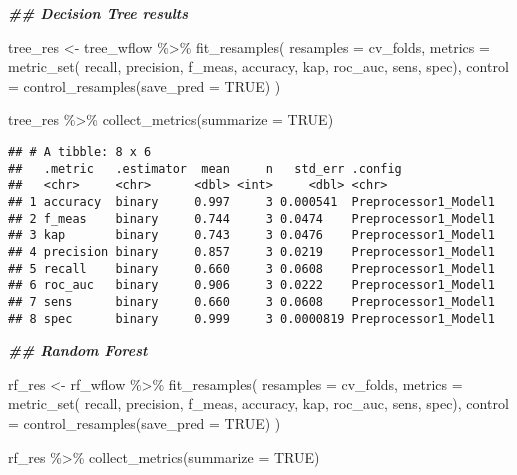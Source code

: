 \documentclass[
]{article}
\newenvironment{Shaded}{\begin{snugshade}}{\end{snugshade}}
\newcommand{\AttributeTok}[1]{\textcolor[rgb]{0.77,0.63,0.00}{#1}}
\newcommand{\ConstantTok}[1]{\textcolor[rgb]{0.00,0.00,0.00}{#1}}
\newcommand{\DocumentationTok}[1]{\textcolor[rgb]{0.56,0.35,0.01}{\textbf{\textit{#1}}}}
\newcommand{\FunctionTok}[1]{\textcolor[rgb]{0.00,0.00,0.00}{#1}}
\newcommand{\NormalTok}[1]{#1}
\newcommand{\OtherTok}[1]{\textcolor[rgb]{0.56,0.35,0.01}{#1}}
\newcommand{\SpecialCharTok}[1]{\textcolor[rgb]{0.00,0.00,0.00}{#1}}
\begin{document}
\begin{Shaded}
\begin{Highlighting}[]
\DocumentationTok{\#\# Decision Tree results}

\NormalTok{tree\_res }\OtherTok{\textless{}{-}}
\NormalTok{  tree\_wflow }\SpecialCharTok{\%\textgreater{}\%} 
  \FunctionTok{fit\_resamples}\NormalTok{(}
    \AttributeTok{resamples =}\NormalTok{ cv\_folds, }
    \AttributeTok{metrics =} \FunctionTok{metric\_set}\NormalTok{(}
\NormalTok{      recall, precision, f\_meas, }
\NormalTok{      accuracy, kap,}
\NormalTok{      roc\_auc, sens, spec),}
    \AttributeTok{control =} \FunctionTok{control\_resamples}\NormalTok{(}\AttributeTok{save\_pred =} \ConstantTok{TRUE}\NormalTok{)}
\NormalTok{    ) }

\NormalTok{tree\_res }\SpecialCharTok{\%\textgreater{}\%}  \FunctionTok{collect\_metrics}\NormalTok{(}\AttributeTok{summarize =} \ConstantTok{TRUE}\NormalTok{)}
\end{Highlighting}
\end{Shaded}

\begin{verbatim}
## # A tibble: 8 x 6
##   .metric   .estimator  mean     n   std_err .config             
##   <chr>     <chr>      <dbl> <int>     <dbl> <chr>               
## 1 accuracy  binary     0.997     3 0.000541  Preprocessor1_Model1
## 2 f_meas    binary     0.744     3 0.0474    Preprocessor1_Model1
## 3 kap       binary     0.743     3 0.0476    Preprocessor1_Model1
## 4 precision binary     0.857     3 0.0219    Preprocessor1_Model1
## 5 recall    binary     0.660     3 0.0608    Preprocessor1_Model1
## 6 roc_auc   binary     0.906     3 0.0222    Preprocessor1_Model1
## 7 sens      binary     0.660     3 0.0608    Preprocessor1_Model1
## 8 spec      binary     0.999     3 0.0000819 Preprocessor1_Model1
\end{verbatim}

\begin{Shaded}
\begin{Highlighting}[]
\DocumentationTok{\#\# Random Forest}

\NormalTok{rf\_res }\OtherTok{\textless{}{-}}
\NormalTok{  rf\_wflow }\SpecialCharTok{\%\textgreater{}\%} 
  \FunctionTok{fit\_resamples}\NormalTok{(}
    \AttributeTok{resamples =}\NormalTok{ cv\_folds, }
    \AttributeTok{metrics =} \FunctionTok{metric\_set}\NormalTok{(}
\NormalTok{      recall, precision, f\_meas, }
\NormalTok{      accuracy, kap,}
\NormalTok{      roc\_auc, sens, spec),}
    \AttributeTok{control =} \FunctionTok{control\_resamples}\NormalTok{(}\AttributeTok{save\_pred =} \ConstantTok{TRUE}\NormalTok{)}
\NormalTok{    ) }

\NormalTok{rf\_res }\SpecialCharTok{\%\textgreater{}\%}  \FunctionTok{collect\_metrics}\NormalTok{(}\AttributeTok{summarize =} \ConstantTok{TRUE}\NormalTok{)}
\end{Highlighting}
\end{Shaded}
\end{document}
